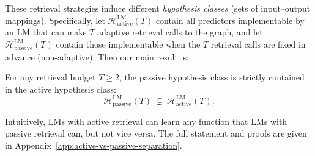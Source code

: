 These retrieval strategies induce different \emph{hypothesis classes} (sets of input--output mappings). Specifically, let
\(\mathcal{H}^{\mathrm{LM}}_{\mathrm{active}}(T)\) contain all predictors implementable by an LM that can make \(T\)
adaptive retrieval calls to the graph, and let \(\mathcal{H}^{\mathrm{LM}}_{\mathrm{passive}}(T)\) contain those implementable when the \(T\)
retrieval calls are fixed in advance (non-adaptive). Then our main result is:

\begin{theorem}
For any retrieval budget \(T\ge 2\), the passive hypothesis class is strictly contained in the active hypothesis class:
\[
\mathcal{H}^{\mathrm{LM}}_{\mathrm{passive}}(T)\ \subsetneq\ \mathcal{H}^{\mathrm{LM}}_{\mathrm{active}}(T).
\]
\end{theorem}

Intuitively, LMs with active retrieval can learn any function that LMs with passive retrieval can, but not vice versa. The full statement and proofs are given in Appendix~\ref{app:active-vs-passive-separation}.




